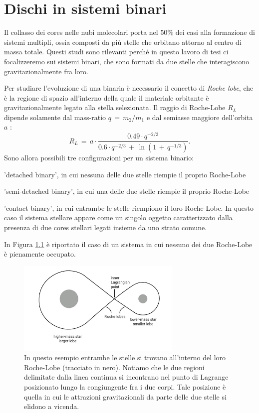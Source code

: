 \chapter{Dischi in sistemi binari}
Il collasso dei cores nelle nubi molecolari porta nel $50\%$ dei casi \parencite{FreqMultipli} alla formazione di sistemi multipli, ossia composti da più stelle che orbitano attorno al centro di massa totale.
Questi studi sono rilevanti perché in questo lavoro di tesi ci focalizzeremo sui sistemi binari, che sono formati da due stelle che interagiscono gravitazionalmente fra loro. 

Per studiare l'evoluzione di una binaria è necessario il concetto di \textit{Roche lobe}, che è la regione di spazio all'interno della quale il materiale orbitante è gravitazionalmente legato alla stella selezionata.
Il raggio di Roche-Lobe $R_L$ dipende solamente dal mass-ratio $q\,=\,m_2/m_1$ e dal semiasse maggiore dell'orbita $a$ \parencite{Eggleton1983}:
\begin{equation}
R_L\,=\,a \cdot \frac{0.49 \cdot q^{-2/3}}{0.6 \cdot q^{-2/3}\,+\,\ln{(1\,+\,q^{-1/3})}}.
\label{eq:roche_lobe_ras}
\end{equation}
Sono allora possibili tre configurazioni per un sistema binario:
\begin{list}{\textbf{-}}{\setlength{\itemsep}{0cm}}
    \item 'detached binary', in cui nessuna delle due stelle riempie il proprio Roche-Lobe
    \item 'semi-detached binary', in cui una delle due stelle riempie il proprio Roche-Lobe
    \item 'contact binary', in cui entrambe le stelle riempiono il loro Roche-Lobe. In questo caso il sistema stellare appare come un singolo oggetto caratterizzato dalla presenza di due cores stellari legati insieme da uno strato comune.
\end{list}
In Figura \ref{fig:roche_lobe} è riportato il caso di un sistema in cui nessuno dei due Roche-Lobe è pienamente occupato.
\begin{figure}[h]
  \centering
  \includegraphics[width=0.7\textwidth]{Immagini/IntroTeorica/RocheLobe.png}
  \caption{In questo esempio entrambe le stelle si trovano all'interno del loro Roche-Lobe (tracciato in nero). Notiamo che le due regioni delimitate dalla linea continua si incontrano nel punto di Lagrange posizionato lungo la congiungente fra i due corpi. Tale posizione è quella in cui le attrazioni gravitazionali da parte delle due stelle si elidono a vicenda. }
  \label{fig:roche_lobe}
\end{figure}

